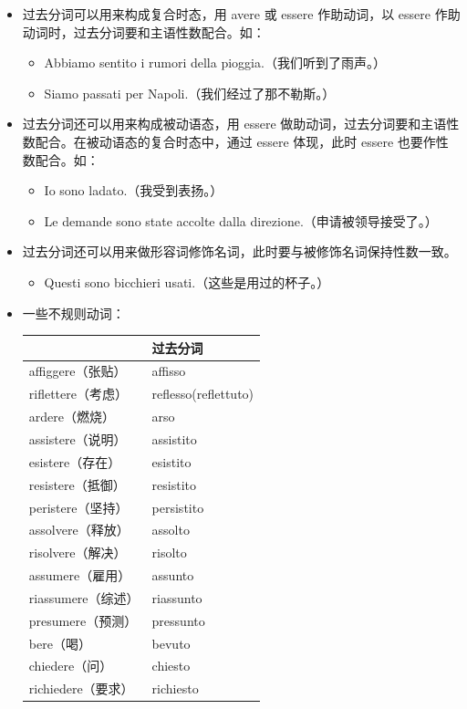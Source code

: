 \documentclass[UTF8,a4paper,titlepage,10pt]{report}
\begin{document}
\begin{enumerate}
\begin{itemize}
\item 过去分词可以用来构成复合时态，用 avere 或 essere 作助动词，以 essere 作助动词时，过去分词要和主语性数配合。如：
\begin{itemize}
\item Abbiamo sentito i rumori della pioggia.（我们听到了雨声。）
\item Siamo passati per Napoli.（我们经过了那不勒斯。）
\end{itemize}
\item 过去分词还可以用来构成被动语态，用 essere 做助动词，过去分词要和主语性数配合。在被动语态的复合时态中，通过 essere 体现，此时 essere 也要作性数配合。如：
\begin{itemize}
\item Io sono ladato.（我受到表扬。）
\item Le demande sono state accolte dalla direzione.（申请被领导接受了。）
\end{itemize}
\item 过去分词还可以用来做形容词修饰名词，此时要与被修饰名词保持性数一致。
\begin{itemize}
\item Questi sono bicchieri usati.（这些是用过的杯子。）
\end{itemize}
\item 一些不规则动词：
\begin{center}
\begin{tabular}{ll}
 & 过去分词\\
\hline
affiggere（张贴） & affisso\\
riflettere（考虑） & reflesso(reflettuto)\\
ardere（燃烧） & arso\\
assistere（说明） & assistito\\
esistere（存在） & esistito\\
resistere（抵御） & resistito\\
peristere（坚持） & persistito\\
assolvere（释放） & assolto\\
risolvere（解决） & risolto\\
assumere（雇用） & assunto\\
riassumere（综述） & riassunto\\
presumere（预测） & pressunto\\
bere（喝） & bevuto\\
chiedere（问） & chiesto\\
richiedere（要求） & richiesto\\

\end{tabular}
\end{center}
\end{itemize}
\end{enumerate}
\end{document}
